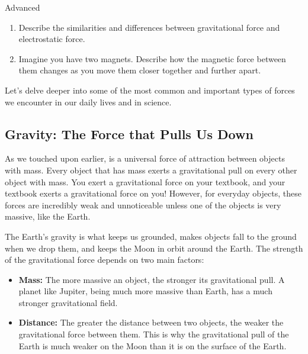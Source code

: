 \begin{tieredquestions}{Advanced}
\begin{enumerate}
    \item  Describe the similarities and differences between gravitational force and electrostatic force.
    \item  Imagine you have two magnets. Describe how the magnetic force between them changes as you move them closer together and further apart.
\end{enumerate}
\end{tieredquestions}


\FloatBarrier

Let's delve deeper into some of the most common and important types of forces we encounter in our daily lives and in science.

\subsection{Gravity: The Force that Pulls Us Down}

\begin{marginnote}
\end{marginnote}
As we touched upon earlier,  is a universal force of attraction between objects with mass.  Every object that has mass exerts a gravitational pull on every other object with mass.  You exert a gravitational force on your textbook, and your textbook exerts a gravitational force on you!  However, for everyday objects, these forces are incredibly weak and unnoticeable unless one of the objects is very massive, like the Earth.

The Earth's gravity is what keeps us grounded, makes objects fall to the ground when we drop them, and keeps the Moon in orbit around the Earth.  The strength of the gravitational force depends on two main factors:

\begin{itemize}
    \item \textbf{Mass:} The more massive an object, the stronger its gravitational pull.  A planet like Jupiter, being much more massive than Earth, has a much stronger gravitational field.
    \item \textbf{Distance:}  The greater the distance between two objects, the weaker the gravitational force between them.  This is why the gravitational pull of the Earth is much weaker on the Moon than it is on the surface of the Earth.
\end{itemize}

